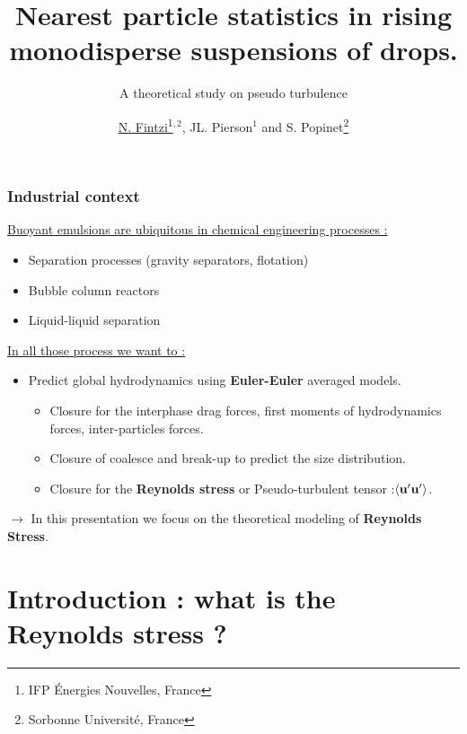\documentclass{sintefbeamer}
\title{Nearest particle statistics in rising monodisperse suspensions of drops.}
\subtitle{A theoretical study on pseudo turbulence}
\author{\href{https://scholar.google.com/citations?user=GQDBlaQAAAAJ&hl=en}{\underline{N. Fintzi}\footnote{IFP \'Energies Nouvelles, France}$^{,2}$}, JL. Pierson$^1$ and S. Popinet\footnote{Sorbonne Universit\'e, France}}
\begin{document}
\maketitle


\begin{frame}
  \frametitle{Industrial context}
  \underline{Buoyant emulsions are ubiquitous in chemical engineering processes :}
  \begin{itemize}
    \item Separation processes (gravity separators, flotation)
    \item Bubble column reactors
    \item Liquid-liquid separation
  \end{itemize}
  \vfill
  \pause
  \underline{In all those process we want to : }
  \begin{itemize}
    \item Predict global hydrodynamics using \textbf{Euler-Euler} averaged models. 
    \begin{itemize}
      \item Closure for the interphase drag forces, first moments of hydrodynamics forces, inter-particles forces.
      \item Closure of coalesce and break-up to predict the size distribution.
      \item Closure for the \textbf{Reynolds stress} or Pseudo-turbulent tensor :$\left<\textbf{u}'\textbf{u}'\right>$.
    \end{itemize}
  \end{itemize}
\pause
  \vfill
$\to$ In this presentation we focus on the theoretical modeling of \textbf{Reynolds Stress}.
\end{frame}

\section{Introduction : what is the Reynolds stress ?}
\end{document}
